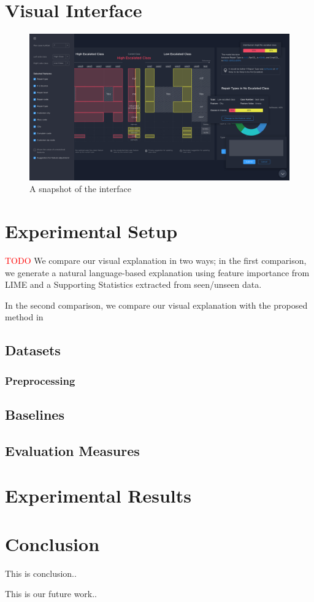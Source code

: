 \documentclass{llncs}
\begin{document}
\section{Visual Interface}


\begin{figure}	
	\centering
	\includegraphics[scale=0.1]{1_3_xai.png}
	\centering\caption{A snapshot of the interface}	
\end{figure}


 
\section{Experimental Setup}
\textcolor{red}{TODO} We compare our visual explanation in two ways; in the first comparison, we generate a natural language-based explanation using feature importance from LIME and a Supporting Statistics extracted from seen/unseen data.

In the second comparison, we compare our visual explanation with the proposed method in 
\subsection{Datasets}


\subsubsection{Preprocessing}

\subsection{Baselines}

\subsection{Evaluation Measures}

\section{Experimental Results}

\section{Conclusion}

This is conclusion..

This is our future work..




\end{document}
